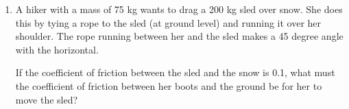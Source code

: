 \documentclass[12pt]{article}
\begin{document}
\begin{enumerate}
\bigskip

\item{A hiker with a mass of 75 kg wants to drag a 200 kg sled over snow. She does this by tying a rope to the sled (at ground level) and running it over her shoulder. The rope running between her and the sled makes a 45 degree angle with the horizontal.

  If the coefficient of friction between the sled and the snow is 0.1, what must the coefficient of friction between her boots and the ground be for her to move the sled?}


    \end{enumerate}
\end{document}
